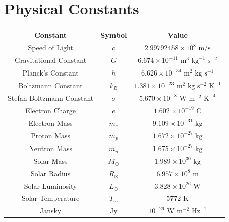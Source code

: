 \documentclass[a4paper,12pt]{article}
\numberwithin{equation}{section}
\begin{document}
\section*{Physical Constants}
\vspace*{\fill}
\begin{table}[H]
        \centering
        \begin{tabular}{|c|c|c|}
                \hline
                Constant & Symbol & Value \\
                \hline
                Speed of Light & $c$ & $2.99792458 \times 10^8 \text{ m/s}$ \\
                Gravitational Constant & $G$ & $6.674 \times 10^{-11} \text{ m}^3 \text{ kg}^{-1} \text{ s}^{-2}$ \\
                Planck's Constant & $h$ & $6.626 \times 10^{-34} \text{ m}^2 \text{ kg} \text{ s}^{-1}$ \\
                Boltzmann Constant & $k_B$ & $1.381 \times 10^{-23} \text{ m}^2 \text{ kg} \text{ s}^{-2} \text{ K}^{-1}$ \\
                Stefan-Boltzmann Constant & $\sigma$ & $5.670 \times 10^{-8} \text{ W} \text{ m}^{-2} \text{ K}^{-4}$ \\
                Electron Charge & $e$ & $1.602 \times 10^{-19} \text{ C}$ \\
                Electron Mass & $m_e$ & $9.109 \times 10^{-31} \text{ kg}$ \\
                Proton Mass & $m_p$ & $1.672 \times 10^{-27} \text{ kg}$ \\
                Neutron Mass & $m_n$ & $1.675 \times 10^{-27} \text{ kg}$ \\
                Solar Mass & $M_\odot$ & $1.989 \times 10^{30} \text{ kg}$ \\
                Solar Radius & $R_\odot$ & $6.957 \times 10^8 \text{ m}$ \\
                Solar Luminosity & $L_\odot$ & $3.828 \times 10^{26} \text{ W}$ \\
                Solar Temperature & $T_\odot$ & $5772 \text{ K}$ \\
                Jansky & Jy & $10^{-26} \text{ W} \text{ m}^{-2} \text{ Hz}^{-1}$ \\
                \hline
        \end{tabular}
\end{table}
\vspace*{\fill}

\newpage






\newpage

\newpage
\printindex
\end{document}
